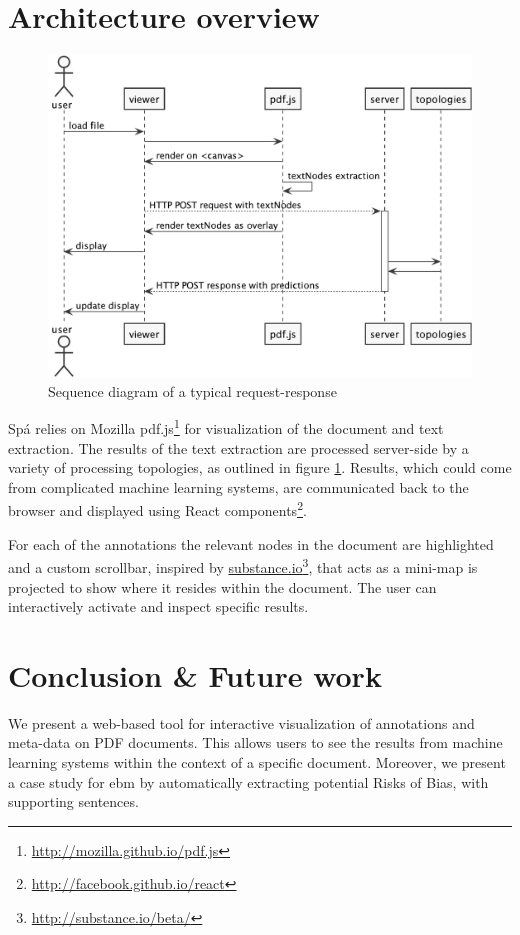 \documentclass[runningheads,a4paper]{llncs}
\begin{document}
\section{Architecture overview}
\label{section:architecture}
\begin{figure}[htb]
\centering
\includegraphics[width=.9\linewidth]{./diagrams/sequence.pdf}
\caption{\label{fig:sequence}Sequence diagram of a typical request-response}
\end{figure}
Spá relies on Mozilla pdf.js\footnote{\url{http://mozilla.github.io/pdf.js}} for visualization of the document and text extraction.
The results of the text extraction are processed server-side by a variety of processing topologies, as outlined in figure \ref{fig:sequence}.
Results, which could come from complicated machine learning systems, are communicated back to the browser and displayed using React components\footnote{\url{http://facebook.github.io/react}}.

For each of the annotations the relevant nodes in the document are highlighted and a custom scrollbar, inspired by \href{http://substance.io/}{substance.io}\footnote{\url{http://substance.io/beta/}}, that acts as a mini-map is projected to show where it resides within the document.
The user can interactively activate and inspect specific results.

\section{Conclusion \& Future work}
We present a web-based tool for interactive visualization of annotations and meta-data on PDF documents.
This allows users to see the results from machine learning systems within the context of a specific document.
Moreover, we present a case study for \ac{ebm} by automatically extracting potential Risks of Bias, with supporting sentences.
\end{document}
